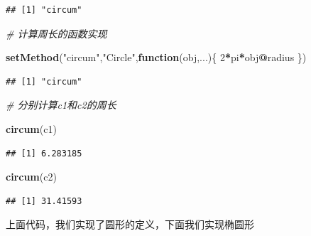 \documentclass[]{book}
\newenvironment{Shaded}{\begin{snugshade}}{\end{snugshade}}
\newcommand{\KeywordTok}[1]{\textcolor[rgb]{0.13,0.29,0.53}{\textbf{#1}}}
\newcommand{\DecValTok}[1]{\textcolor[rgb]{0.00,0.00,0.81}{#1}}
\newcommand{\StringTok}[1]{\textcolor[rgb]{0.31,0.60,0.02}{#1}}
\newcommand{\CommentTok}[1]{\textcolor[rgb]{0.56,0.35,0.01}{\textit{#1}}}
\newcommand{\ControlFlowTok}[1]{\textcolor[rgb]{0.13,0.29,0.53}{\textbf{#1}}}
\newcommand{\OperatorTok}[1]{\textcolor[rgb]{0.81,0.36,0.00}{\textbf{#1}}}
\newcommand{\NormalTok}[1]{#1}
\begin{document}
\begin{verbatim}
## [1] "circum"
\end{verbatim}

\begin{Shaded}
\begin{Highlighting}[]
\CommentTok{# 计算周长的函数实现}

\KeywordTok{setMethod}\NormalTok{(}\StringTok{"circum"}\NormalTok{,}\StringTok{"Circle"}\NormalTok{,}\ControlFlowTok{function}\NormalTok{(obj,...)\{}
  \DecValTok{2}\OperatorTok{*}\NormalTok{pi}\OperatorTok{*}\NormalTok{obj}\OperatorTok{@}\NormalTok{radius}
\NormalTok{\})}
\end{Highlighting}
\end{Shaded}

\begin{verbatim}
## [1] "circum"
\end{verbatim}

\begin{Shaded}
\begin{Highlighting}[]
\CommentTok{# 分别计算c1和c2的周长}

\KeywordTok{circum}\NormalTok{(c1)}
\end{Highlighting}
\end{Shaded}

\begin{verbatim}
## [1] 6.283185
\end{verbatim}

\begin{Shaded}
\begin{Highlighting}[]
\KeywordTok{circum}\NormalTok{(c2)}
\end{Highlighting}
\end{Shaded}

\begin{verbatim}
## [1] 31.41593
\end{verbatim}

上面代码，我们实现了圆形的定义，下面我们实现椭圆形
\end{document}
